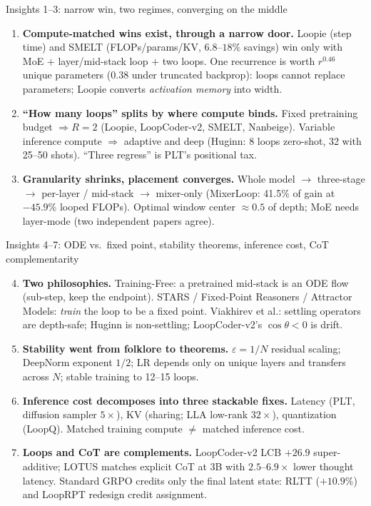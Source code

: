 \documentclass[aspectratio=169,10pt]{beamer}
\newcommand{\pos}[1]{\textcolor{positive}{#1}}
\newcommand{\con}[1]{\textcolor{negative}{#1}}
\newcommand{\HL}[1]{\textcolor{emphasis}{#1}}
\begin{document}
\begin{frame}{Insights 1--3: narrow win, two regimes, converging on the middle}
  \begin{enumerate}
    \item \textbf{Compute-matched wins exist, through a narrow door.} Loopie (step time) and SMELT (FLOPs/params/KV, $6.8$--$18\%$ savings) win only with \HL{MoE $+$ layer/mid-stack loop $+$ two loops}. One recurrence is worth $r^{0.46}$ unique parameters ($0.38$ under truncated backprop): loops cannot replace parameters; Loopie converts \emph{activation memory} into width.
    \item \textbf{``How many loops'' splits by where compute binds.} Fixed pretraining budget $\Rightarrow R{=}2$ (Loopie, LoopCoder-v2, SMELT, Nanbeige). Variable inference compute $\Rightarrow$ adaptive and deep (Huginn: 8 loops zero-shot, 32 with 25--50 shots). ``Three regress'' is \con{PLT's positional tax}.
    \item \textbf{Granularity shrinks, placement converges.} Whole model $\to$ three-stage $\to$ per-layer / mid-stack $\to$ mixer-only (MixerLoop: 41.5\% of gain at $-45.9\%$ looped FLOPs). Optimal window center $\approx 0.5$ of depth; MoE needs layer-mode (two independent papers agree).
  \end{enumerate}
\end{frame}

\begin{frame}{Insights 4--7: ODE vs.\ fixed point, stability theorems, inference cost, CoT complementarity}
  \begin{enumerate}\setcounter{enumi}{3}
    \item \textbf{Two philosophies.} Training-Free: a pretrained mid-stack is an \pos{ODE flow} (sub-step, keep the endpoint). STARS / Fixed-Point Reasoners / Attractor Models: \emph{train} the loop to be a \pos{fixed point}. Viakhirev et al.: settling operators are depth-safe; Huginn is non-settling; LoopCoder-v2's $\cos\theta<0$ is drift.
    \item \textbf{Stability went from folklore to theorems.} $\varepsilon{=}1/N$ residual scaling; DeepNorm exponent $1/2$; LR depends only on unique layers and transfers across $N$; stable training to 12--15 loops.
    \item \textbf{Inference cost decomposes into three stackable fixes.} Latency (PLT, diffusion sampler $5\times$), KV (sharing; LLA low-rank $32\times$), quantization (LoopQ). \con{Matched training compute $\ne$ matched inference cost.}
    \item \textbf{Loops and CoT are complements.} LoopCoder-v2 LCB $+26.9$ super-additive; LOTUS matches explicit CoT at 3B with $2.5$--$6.9\times$ lower thought latency. Standard GRPO credits only the final latent state: RLTT ($+10.9\%$) and LoopRPT redesign credit assignment.
  \end{enumerate}
\end{frame}
\end{document}
